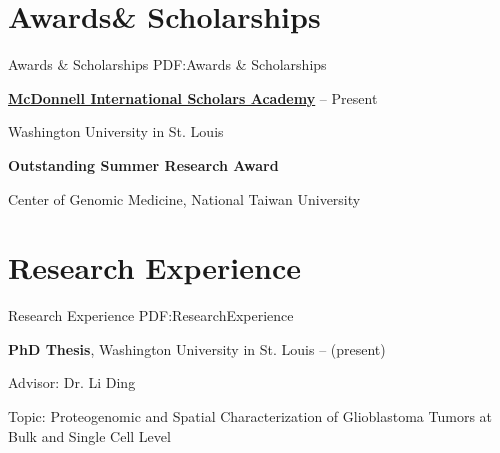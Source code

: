 \documentclass[a4paper,12pt,oneside]{article}
\begin{document}
\begin{body}

\section{Awards\newline\& Scholarships}
{Awards \& Scholarships}
{PDF:Awards \& Scholarships}

\href{https://global.wustl.edu/mcdonnell-academy/}
{\textbf{McDonnell International Scholars Academy}}
\hfill
{} --
Present
\par
Washington University in St. Louis

\EntryGapNoBreak
\textbf{Outstanding Summer Research Award}
\hfill
{}
\par
Center of Genomic Medicine, National Taiwan University




\section{Research Experience}
{Research Experience}
{PDF:ResearchExperience}

\textbf{PhD Thesis},
Washington University in St. Louis
\hfill
{} --
(present)
\par
\begin{detail}
    \begin{detailitem}
    \item Advisor: Dr. Li Ding
    \item Topic: Proteogenomic and Spatial Characterization of Glioblastoma Tumors at Bulk and Single Cell Level
    \end{detailitem}
\end{detail}



\end{body}
\end{document}
